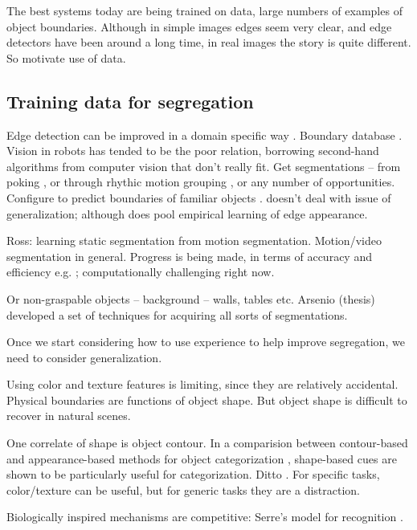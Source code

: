 The best systems today are being trained on data, large numbers
of examples of object boundaries.  Although in simple images
edges seem very clear, and edge detectors have been around
a long time, in real images the story is quite different.
So motivate use of data.




\subsection{Training data for segregation}

Edge detection can be improved in a domain
specific way \cite{konishi03statistical}.
Boundary database \cite{martin04learning}.
%
%
Vision in robots has tended to be the poor relation, borrowing
second-hand algorithms from computer vision that don't really
fit.
%
Get segmentations --
from poking \cite{fitzpatrick03grounding},
or through rhythic motion grouping \cite{arsenio05exploiting},
or any number of opportunities.
%
Configure to predict boundaries of familiar objects
\cite{fitzpatrick03object}.
doesn't deal with issue of generalization; although
does pool empirical learning of edge appearance.

Ross: learning static segmentation from motion segmentation.
\cite{ross05learning}
Motion/video segmentation in general.
Progress is being made, in terms of accuracy
and efficiency e.g. \cite{cremers05motion,fowlkes04spectral};
computationally challenging right now.

Or non-graspable objects -- background -- walls, tables etc.
Arsenio (thesis) developed a set of techniques for acquiring
all sorts of segmentations.


Once we start considering how to use experience to help
improve segregation, we need to consider generalization.

Using color and texture features is limiting, since they
are relatively accidental.  Physical boundaries are functions
of object shape.  But object shape is difficult to recover in
natural scenes.

One correlate of shape is object contour.  In a comparision between
contour-based and appearance-based methods for object categorization
\cite{leibe03analyzing}, shape-based cues are shown to be
particularly useful for categorization.
Ditto \cite{lecun04learning}.
For specific tasks, color/texture can be useful, but for 
generic tasks they are a distraction.

Biologically inspired mechanisms are competitive:
Serre's model for recognition \cite{serre05object}.

